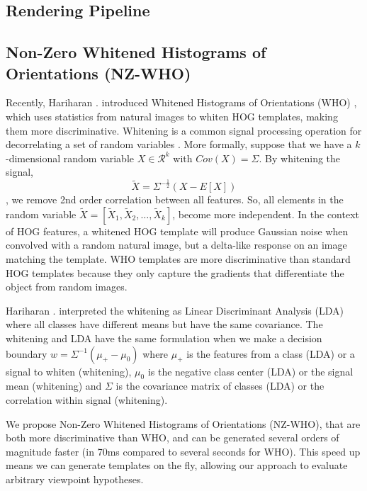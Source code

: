 \documentclass[10pt,twocolumn,letterpaper]{article}
\begin{document}
\subsection{Rendering Pipeline}

\subsection{Non-Zero Whitened Histograms of Orientations (NZ-WHO)}

Recently, Hariharan \etal. introduced Whitened Histograms of Orientations (WHO)
\cite{Hariharan12}, which uses statistics from natural images to whiten HOG
templates, making them more discriminative. Whitening is a common signal
processing operation for decorrelating a set of random variables
\cite{Martinsson05, Belouchrani00}. More formally, suppose that we have a
$k$-dimensional random variable $X \in \mathcal{R}^k$ with $Cov(X)=\Sigma$. By
whitening the signal,
\begin{equation}
\tilde{X}=\Sigma^{-\frac{1}{2}}(X - E[X]) \label{eq:whitening}
\end{equation}
, we
remove 2nd order correlation between all features. So, all elements in the
random variable $\tilde{X} = \left[\tilde{X}_1, \tilde{X}_2, \dots,
\tilde{X}_k\right]$, become more independent. In the context of HOG features, a
whitened HOG template will produce Gaussian noise when convolved with a random
natural image, but a delta-like response on an image matching the template. WHO
templates are more discriminative than standard HOG templates because they only
capture the gradients that differentiate the object from random images.

Hariharan \etal. interpreted the
whitening as Linear Discriminant Analysis (LDA) where all classes have different
means but have the same covariance. The whitening and LDA have the same
formulation when we make a decision boundary $w = \Sigma^{-1}(\mu_+ - \mu_0)$
where $\mu_+$ is the features from a class (LDA) or a signal to whiten
(whitening), $\mu_0$ is the negative class center (LDA) or the signal mean
(whitening) and $\Sigma$ is the covariance matrix of classes (LDA) or
the correlation within signal (whitening).

We propose Non-Zero Whitened Histograms of Orientations (NZ-WHO), that are both more discriminative than WHO, and can be generated several orders of magnitude faster (in 70ms compared to several seconds for WHO). This speed up means we can generate templates on the fly, allowing our approach to evaluate arbitrary viewpoint hypotheses.
\end{document}
